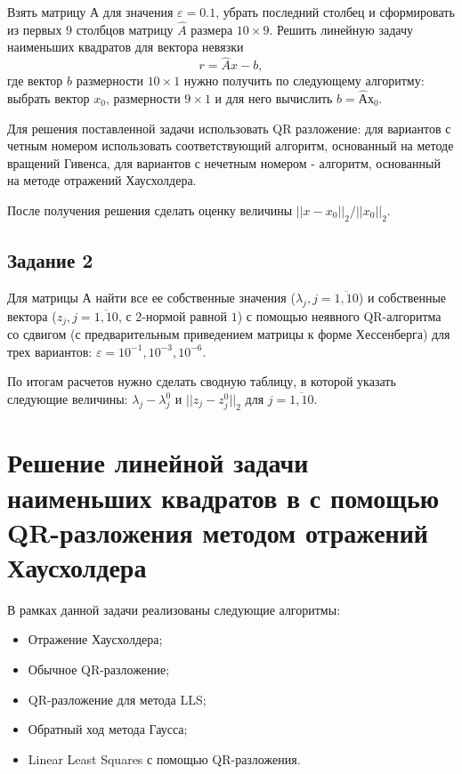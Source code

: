 \documentclass[a4paper,14pt]{extarticle}
\renewcommand{\epsilon}{\varepsilon}
\begin{document}
Взять матрицу $А$ для значения $\epsilon = 0.1$, убрать последний столбец и сформировать из первых $9$ столбцов матрицу $\hat{A}$ размера $10 \times 9$. Решить линейную задачу наименьших квадратов для вектора невязки
\[
r = \hat{A} x - b,
\]
где вектор $b$ размерности $10 \times 1$ нужно получить по следующему алгоритму: выбрать вектор $x_0$, размерности $9 \times 1$ и для него вычислить $b = \hat{А} х_0$.

Для решения поставленной задачи использовать QR разложение: для вариантов с четным номером использовать соответствующий алгоритм, основанный на методе вращений Гивенса, для вариантов с нечетным номером - алгоритм, основанный на методе отражений Хаусхолдера.

После получения решения сделать оценку величины $|| x - x_0 ||_2 / ||x_0||_2$.

\subsection{Задание 2}

Для матрицы $А$ найти все ее собственные значения ($\lambda_j, j = \overline{1, 10}$) и собственные вектора ($z_j, j = \overline{1, 10}$, с $2$-нормой равной $1$) с помощью неявного QR-алгоритма со сдвигом (с предварительным приведением матрицы к форме Хессенберга) для трех вариантов: $\epsilon = 10^{-1}, 10^{-3}, 10^{-6}$.

По итогам расчетов нужно сделать сводную таблицу, в которой указать следующие величины: $\lambda_j - \lambda_j^0$ и $||z_j - z_j^0||_2$ для $j = \overline{1, 10}$.

\section{Решение линейной задачи наименьших квадратов в с помощью QR-разложения методом отражений Хаусхолдера}

В рамках данной задачи реализованы следующие алгоритмы:
\begin{itemize}
\item Отражение Хаусхолдера;

\item Обычное QR-разложение;

\item QR-разложение для метода LLS;

\item Обратный ход метода Гаусса;

\item Linear Least Squares с помощью QR-разложения.
\end{itemize}
\end{document}

